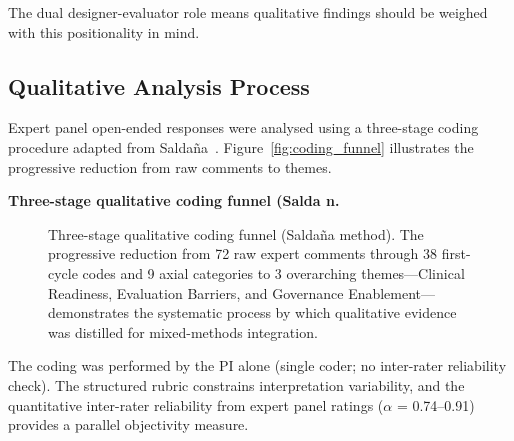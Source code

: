 \noindent The dual designer-evaluator role means qualitative findings should be weighed with this positionality in mind.

\subsection{Qualitative Analysis Process}

Expert panel open-ended responses were analysed using a three-stage coding procedure adapted from Saldaña~\cite{saldana2021coding}. Figure~\ref{fig:coding_funnel} illustrates the progressive reduction from raw comments to themes.

\noindent\textbf{Three-stage qualitative coding funnel (Salda n.}

\begin{figure}[!htbp]
\centering
{}
\caption[Three-stage qualitative coding funnel (Saldana method)]{Three-stage qualitative coding funnel (Salda\~{n}a method). The progressive reduction from 72 raw expert comments through 38 first-cycle codes and 9 axial categories to 3 overarching themes---Clinical Readiness, Evaluation Barriers, and Governance Enablement---demonstrates the systematic process by which qualitative evidence was distilled for mixed-methods integration.}
\end{figure}

\noindent The coding was performed by the PI alone (single coder; no inter-rater reliability check). The structured rubric constrains interpretation variability, and the quantitative inter-rater reliability from expert panel ratings ($\alpha$ = 0.74--0.91) provides a parallel objectivity measure.


